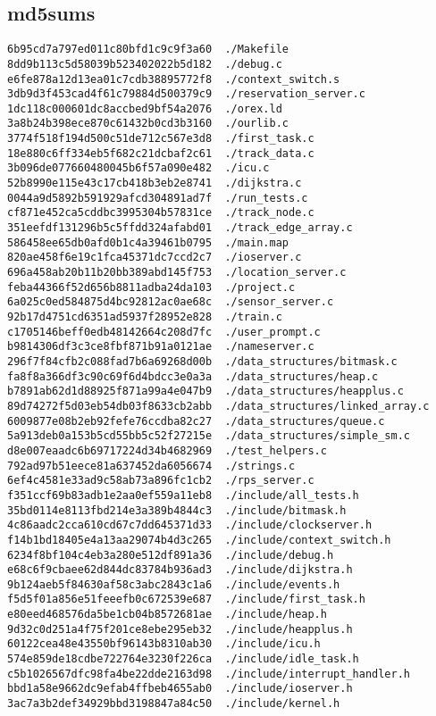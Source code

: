 \documentclass[letterpaper]{article}
\begin{document}
\subsection{md5sums}
\begin{verbatim}
6b95cd7a797ed011c80bfd1c9c9f3a60  ./Makefile
8dd9b113c5d58039b523402022b5d182  ./debug.c
e6fe878a12d13ea01c7cdb38895772f8  ./context_switch.s
3db9d3f453cad4f61c79884d500379c9  ./reservation_server.c
1dc118c000601dc8accbed9bf54a2076  ./orex.ld
3a8b24b398ece870c61432b0cd3b3160  ./ourlib.c
3774f518f194d500c51de712c567e3d8  ./first_task.c
18e880c6ff334eb5f682c21dcbaf2c61  ./track_data.c
3b096de077660480045b6f57a090e482  ./icu.c
52b8990e115e43c17cb418b3eb2e8741  ./dijkstra.c
0044a9d5892b591929afcd304891ad7f  ./run_tests.c
cf871e452ca5cddbc3995304b57831ce  ./track_node.c
351eefdf131296b5c5ffdd324afabd01  ./track_edge_array.c
586458ee65db0afd0b1c4a39461b0795  ./main.map
820ae458f6e19c1fca45371dc7ccd2c7  ./ioserver.c
696a458ab20b11b20bb389abd145f753  ./location_server.c
feba44366f52d656b8811adba24da103  ./project.c
6a025c0ed584875d4bc92812ac0ae68c  ./sensor_server.c
92b17d4751cd6351ad5937f28952e828  ./train.c
c1705146beff0edb48142664c208d7fc  ./user_prompt.c
b9814306df3c3ce8fbf871b91a0121ae  ./nameserver.c
296f7f84cfb2c088fad7b6a69268d00b  ./data_structures/bitmask.c
fa8f8a366df3c90c69f6d4bdcc3e0a3a  ./data_structures/heap.c
b7891ab62d1d88925f871a99a4e047b9  ./data_structures/heapplus.c
89d74272f5d03eb54db03f8633cb2abb  ./data_structures/linked_array.c
6009877e08b2eb92fefe76ccdba82c27  ./data_structures/queue.c
5a913deb0a153b5cd55bb5c52f27215e  ./data_structures/simple_sm.c
d8e007eaadc6b69717224d34b4682969  ./test_helpers.c
792ad97b51eece81a637452da6056674  ./strings.c
6ef4c4581e33ad9c58ab73a896fc1cb2  ./rps_server.c
f351ccf69b83adb1e2aa0ef559a11eb8  ./include/all_tests.h
35bd0114e8113fbd214e3a389b4844c3  ./include/bitmask.h
4c86aadc2cca610cd67c7dd645371d33  ./include/clockserver.h
f14b1bd18405e4a13aa29074b4d3c265  ./include/context_switch.h
6234f8bf104c4eb3a280e512df891a36  ./include/debug.h
e68c6f9cbaee62d844dc83784b936ad3  ./include/dijkstra.h
9b124aeb5f84630af58c3abc2843c1a6  ./include/events.h
f5d5f01a856e51feeefb0c672539e687  ./include/first_task.h
e80eed468576da5be1cb04b8572681ae  ./include/heap.h
9d32c0d251a4f75f201ce8ebe295eb32  ./include/heapplus.h
60122cea48e43550bf96143b8310ab30  ./include/icu.h
574e859de18cdbe722764e3230f226ca  ./include/idle_task.h
c5b1026567dfc98fa4be22dde2163d98  ./include/interrupt_handler.h
bbd1a58e9662dc9efab4ffbeb4655ab0  ./include/ioserver.h
3ac7a3b2def34929bbd3198847a84c50  ./include/kernel.h

\end{verbatim}
\end{document}
